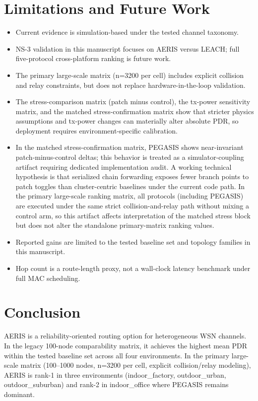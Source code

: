 ﻿\documentclass[sensors,article,submit,moreauthors,pdftex]{Definitions/mdpi}
\begin{document}
\section{Limitations and Future Work}
\begin{itemize}
\item Current evidence is simulation-based under the tested channel taxonomy.
\item NS-3 validation in this manuscript focuses on AERIS versus LEACH; full five-protocol cross-platform ranking is future work.
\item The primary large-scale matrix (n=3200 per cell) includes explicit collision and relay constraints, but does not replace hardware-in-the-loop validation.
\item The stress-comparison matrix (patch minus control), the tx-power sensitivity matrix, and the matched stress-confirmation matrix show that stricter physics assumptions and tx-power changes can materially alter absolute PDR, so deployment requires environment-specific calibration.
\item In the matched stress-confirmation matrix, PEGASIS shows near-invariant patch-minus-control deltas; this behavior is treated as a simulator-coupling artifact requiring dedicated implementation audit. A working technical hypothesis is that serialized chain forwarding exposes fewer branch points to patch toggles than cluster-centric baselines under the current code path. In the primary large-scale ranking matrix, all protocols (including PEGASIS) are executed under the same strict collision-and-relay path without mixing a control arm, so this artifact affects interpretation of the matched stress block but does not alter the standalone primary-matrix ranking values.
\item Reported gains are limited to the tested baseline set and topology families in this manuscript.
\item Hop count is a route-length proxy, not a wall-clock latency benchmark under full MAC scheduling.
\end{itemize}

\section{Conclusion}
AERIS is a reliability-oriented routing option for heterogeneous WSN channels. In the legacy 100-node comparability matrix, it achieves the highest mean PDR within the tested baseline set across all four environments. In the primary large-scale matrix (100--1000 nodes, n=3200 per cell, explicit collision/relay modeling), AERIS is rank-1 in three environments (indoor\_factory, outdoor\_urban, outdoor\_suburban) and rank-2 in indoor\_office where PEGASIS remains dominant.
\end{document}
